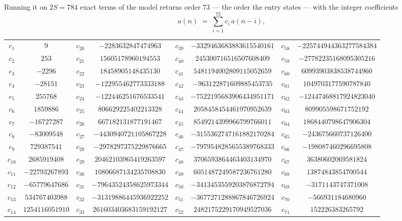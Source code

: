 \documentclass[11pt,a4paper]{article}
\theoremstyle{plain}
\theoremstyle{definition}
\begin{document}
Running it on $2S=784$ exact terms of the model returns order $73$ --- the order the
entry states --- with the integer coefficients
\[
a(n)\;=\;\sum_{i=1}^{73}c_i\,a(n-i),
\]
\begin{center}\small
\begin{tabular}{cccccccc}
$c_{1}$ & $9$ & $c_{20}$ & $-2283632847474963$ & $c_{39}$ & $-3329463683883615540161$ & $c_{58}$ & $-225744944363277584384$ \\
$c_{2}$ & $253$ & $c_{21}$ & $15605178960194553$ & $c_{40}$ & $245300716516507608409$ & $c_{59}$ & $-27782235168095305216$ \\
$c_{3}$ & $-2296$ & $c_{22}$ & $18458905148435130$ & $c_{41}$ & $5481194002809115052659$ & $c_{60}$ & $60993903838538744960$ \\
$c_{4}$ & $-28151$ & $c_{23}$ & $-122955462773333188$ & $c_{42}$ & $-963122871609885453735$ & $c_{61}$ & $1049703177590787840$ \\
$c_{5}$ & $255768$ & $c_{24}$ & $-122446251676533541$ & $c_{43}$ & $-7522195683906434951171$ & $c_{62}$ & $-12447468817924823040$ \\
$c_{6}$ & $1859886$ & $c_{25}$ & $806629225402213328$ & $c_{44}$ & $2058458454461970952639$ & $c_{63}$ & $809905598671752192$ \\
$c_{7}$ & $-16727287$ & $c_{26}$ & $667182131877191467$ & $c_{45}$ & $8549214399966799766011$ & $c_{64}$ & $1868440798647906304$ \\
$c_{8}$ & $-83009548$ & $c_{27}$ & $-4430940721105867228$ & $c_{46}$ & $-3155362747161882170284$ & $c_{65}$ & $-243675660737126400$ \\
$c_{9}$ & $729387541$ & $c_{28}$ & $-2978297375229876665$ & $c_{47}$ & $-7979548285655389768333$ & $c_{66}$ & $-198087460296695808$ \\
$c_{10}$ & $2685919408$ & $c_{29}$ & $20462103965419263597$ & $c_{48}$ & $3706593864463403134970$ & $c_{67}$ & $36380602069581824$ \\
$c_{11}$ & $-22793267893$ & $c_{30}$ & $10806687134235708830$ & $c_{49}$ & $6051487249587236761280$ & $c_{68}$ & $13874843854700544$ \\
$c_{12}$ & $-65779647686$ & $c_{31}$ & $-79643524358625973344$ & $c_{50}$ & $-3413453559203876872794$ & $c_{69}$ & $-3171143747371008$ \\
$c_{13}$ & $534767403988$ & $c_{32}$ & $-31319886445936922252$ & $c_{51}$ & $-3677271288867846726924$ & $c_{70}$ & $-566931184680960$ \\
$c_{14}$ & $1254116051910$ & $c_{33}$ & $261603403683159192127$ & $c_{52}$ & $2482175229170949527036$ & $c_{71}$ & $152226383265792$ \\

\end{tabular}
\end{center}
\end{document}
